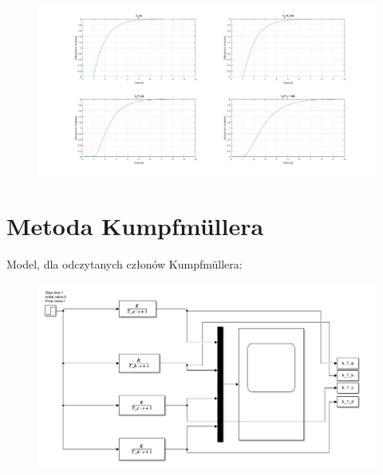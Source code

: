 \documentclass{article}
\begin{document}
\begin{figure}[h!]
\hspace{-5cm}
    \includegraphics[scale=0.5]{inerc_a_b_c_d.png}
    \label{fig:each_iner}
\end{figure}{}


\newpage
\section{Metoda Kumpfmüllera}

Model, dla odczytanych członów Kumpfmüllera:

\begin{figure}[h!]
    \centering
    \includegraphics[scale=0.5]{model_kumpf.png}
    \label{fig:my_label}
\end{figure}{}
\end{document}
